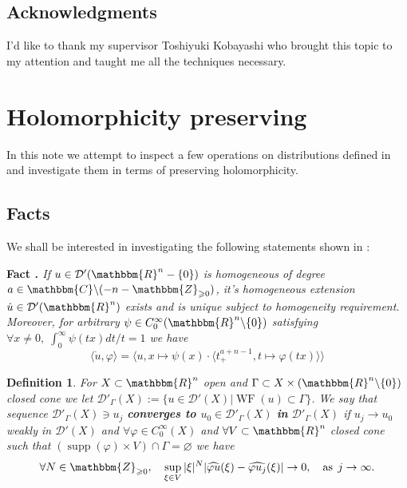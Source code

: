 \documentclass{article}
\newcommand{\assign}{:=}
\newcommand{\tmop}[1]{\ensuremath{\operatorname{#1}}}
\newcommand{\tmtextbf}[1]{{\bfseries{#1}}}
\newcommand{\tmtextit}[1]{{\itshape{#1}}}
\newcommand{\tmtextup}[1]{{\upshape{#1}}}
\newtheorem{definition}{Definition}
\numberwithin{definition}{section}
\numberwithin{lemma}{section}
\numberwithin{proposition}{section}
{\theorembodyfont{\rmfamily}\newtheorem{remark}{Remark}
\numberwithin{remark}{section}
}
\begin{document}
\subsection{Acknowledgments}

I'd like to thank my supervisor Toshiyuki Kobayashi who brought this topic to
my attention and taught me all the techniques necessary.

\section{Holomorphicity preserving}\label{sec:holomorphicity-preserving}

In this note we attempt to inspect a few operations on distributions defined
in {\cite{hormander1983analysis}} and investigate them in terms of preserving
holomorphicity.

\subsection{Facts}

We shall be interested in investigating the following statements shown in
{\cite{hormander1983analysis}}:

{\noindent}\tmtextbf{Fact \tmtextup{1}.
}\tmtextit{\label{holomorphicity-preserving:fact-homog}{\cite[thm.
3.2.3]{hormander1983analysis}} If $u \in \mathcal{D}' ( \mathbbm{R}^n - \{ 0
\})$ is homogeneous of degree $a \in \mathbbm{C}\backslash ( - n
-\mathbbm{Z}_{\geqslant 0})$, it's homogeneous extension $\dot{u} \in
\mathcal{D}' ( \mathbbm{R}^n)$ exists and is unique subject to homogeneity
requirement. Moreover, for arbitrary $\psi \in C_0^{\infty} ( \mathbbm{R}^n
\backslash \{ 0 \})$ satisfying $\forall x \neq 0, \; \int_0^{\infty} \psi ( t
x) d t / t = 1$ we have
\[ \langle \dot{u}, \varphi \rangle = \langle u, x \mapsto \psi ( x) \cdot
   \langle t_+^{a + n - 1}, t \mapsto \varphi ( t x) \rangle \rangle
\]}{\hspace*{\fill}}{\medskip}

\begin{definition}
  {\cite[sec. 8.2]{hormander1983analysis}} For $X \subset \mathbbm{R}^n$ open
  and $\Gamma \subset X \times ( \mathbbm{R}^n \backslash \{ 0 \})$ closed
  cone we let $\mathcal{D}'_{\Gamma} ( X) \assign \{ u \in \mathcal{D}' ( X) |
  \tmop{WF} ( u) \subset \Gamma \}$. We say that sequence
  $\mathcal{D}'_{\Gamma} ( X) \ni u_j$ \tmtextbf{converges to }$u_0 \in
  \mathcal{D}'_{\Gamma} ( X)$ \tmtextbf{in} $\mathcal{D}'_{\Gamma} ( X)$ if
  $u_j \rightarrow u_0$ weakly in $\mathcal{D}' ( X)$ and $\forall \varphi \in
  C_0^{\infty} ( X)$ and $\forall V \subset \mathbbm{R}^n$ closed cone such
  that $( \tmop{supp} ( \varphi) \times V) \cap \Gamma = \varnothing$ we have
  \[ \forall N \in \mathbbm{Z}_{\geqslant 0}, \hspace{1em} \sup_{\xi \in V} |
     \xi |^N | \widehat{\varphi u} ( \xi) - \widehat{\varphi u_j} ( \xi) |
     \rightarrow 0, \hspace{1em} \tmop{as} \; j \rightarrow \infty . \]
\end{definition}
\end{document}
